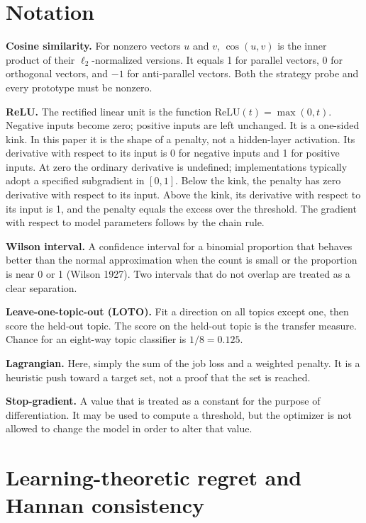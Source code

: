 \documentclass[11pt,a4paper]{article}
\begin{document}
\section{Notation}

\textbf{Cosine similarity.} For nonzero vectors \(u\) and \(v\),
\(\cos(u,v)\) is the inner product of their \(\ell_2\)-normalized
versions. It equals 1 for parallel vectors, 0 for orthogonal vectors,
and \(-1\) for anti-parallel vectors. Both the strategy probe and every
prototype must be nonzero.

\textbf{ReLU.} The rectified linear unit is the function
\(\mathrm{ReLU}(t)=\max(0,t)\). Negative inputs become zero; positive
inputs are left unchanged. It is a one-sided kink. In this paper it is
the shape of a penalty, not a hidden-layer activation. Its derivative
with respect to its input is 0 for negative inputs and 1 for positive
inputs. At zero the ordinary derivative is undefined; implementations
typically adopt a specified subgradient in \([0, 1]\). Below the kink,
the penalty has zero derivative with respect to its input. Above the
kink, its derivative with respect to its input is 1, and the penalty
equals the excess over the threshold. The gradient with respect to model
parameters follows by the chain rule.

\textbf{Wilson interval.} A confidence interval for a binomial
proportion that behaves better than the normal approximation when the
count is small or the proportion is near 0 or 1 (Wilson 1927). Two
intervals that do not overlap are treated as a clear separation.

\textbf{Leave-one-topic-out (LOTO).} Fit a direction on all topics
except one, then score the held-out topic. The score on the held-out
topic is the transfer measure. Chance for an eight-way topic classifier
is \(1/8 = 0.125\).

\textbf{Lagrangian.} Here, simply the sum of the job loss and a weighted
penalty. It is a heuristic push toward a target set, not a proof that
the set is reached.

\textbf{Stop-gradient.} A value that is treated as a constant for the
purpose of differentiation. It may be used to compute a threshold, but
the optimizer is not allowed to change the model in order to alter that
value.

\section{Learning-theoretic regret and Hannan consistency}
\end{document}
